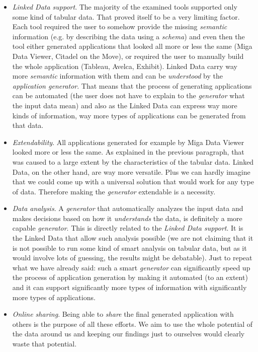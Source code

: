 \begin{itemize}
\item \emph{Linked Data support}. The majority of the examined tools supported only some kind of tabular data. That proved itself to be a very limiting factor. Each tool required the user to somehow provide the missing \emph{semantic} information (e.g. by describing the data using a \emph{schema}) and even then the tool either generated applications that looked all more or less the same (Miga Data Viewer, Citadel on the Move), or required the user to manually build the whole application (Tableau, Avelca, Exhibit). Linked Data carry way more \emph{semantic} information with them and can be \emph{understood} by the \emph{application generator}. That means that the process of generating applications can be automated (the user does not have to explain to the \emph{generator} what the input data mean) and also as the Linked Data can express way more kinds of information, way more types of applications can be generated from that data.
%
%
%
\item \emph{Extendability}. All applications generated for example by Miga Data Viewer looked more or less the same. As explained in the previous paragraph, that was caused to a large extent by the characteristics of the tabular data. Linked Data, on the other hand, are way more versatile. Plus we can hardly imagine that we could come up with a universal solution that would work for any type of data. Therefore making the \emph{generator} extendable is a necessity.
\item \emph{Data analysis}. A \emph{generator} that automatically analyzes the input data and makes decisions based on how it \emph{understands} the data, is definitely a more capable \emph{generator}. This is directly related to the \emph{Linked Data support}. It is the Linked Data that allow such analysis possible (we are not claiming that it is not possible to run some kind of smart analysis on tabular data, but as it would involve lots of guessing, the results might be debatable). Just to repeat what we have already said: such a smart \emph{generator} can significantly speed up the process of application generation by making it automated (to an extent) and it can support significantly more types of information with significantly more types of applications.
\item \emph{Online sharing}. Being able to \emph{share} the final generated application with others is the purpose of all these efforts. We aim to use the whole potential of the data around us and keeping our findings just to ourselves would clearly waste that potential.

\end{itemize}
